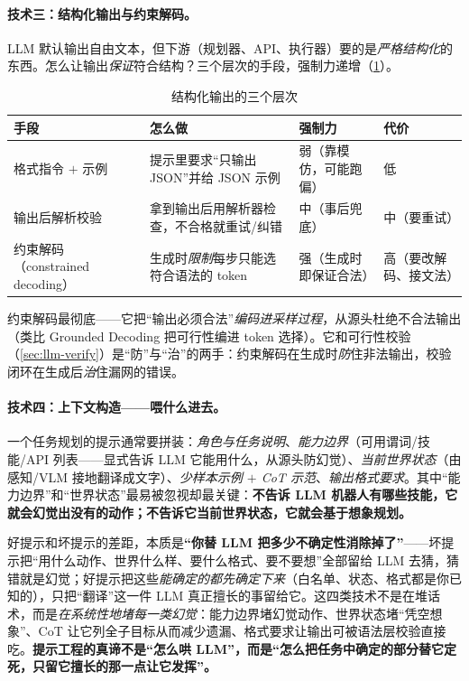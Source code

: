 \paragraph{技术三：结构化输出与约束解码。}
LLM 默认输出自由文本，但下游（规划器、API、执行器）要的是\emph{严格结构化}的东西。怎么让输出\emph{保证}符合结构？三个层次的手段，强制力递增（\cref{tab:structured-output}）。

\begin{table}[H]\centering\small
\caption{结构化输出的三个层次}
\label{tab:structured-output}
\begin{tabular}{p{3.0cm}p{5.0cm}p{2.4cm}p{1.8cm}}
\toprule
手段 & 怎么做 & 强制力 & 代价 \\
\midrule
格式指令 $+$ 示例 & 提示里要求“只输出 JSON”并给 JSON 示例 & 弱（靠模仿，可能跑偏） & 低 \\
输出后解析校验 & 拿到输出后用解析器检查，不合格就重试/纠错 & 中（事后兜底） & 中（要重试） \\
约束解码（constrained decoding） & 生成时\emph{限制}每步只能选符合语法的 token & 强（生成时即保证合法） & 高（要改解码、接文法） \\
\bottomrule
\end{tabular}
\end{table}

\noindent 约束解码最彻底——它把“输出必须合法”\emph{编码进采样过程}，从源头杜绝不合法输出（类比 Grounded Decoding 把可行性编进 token 选择）。它和可行性校验（\cref{sec:llm-verify}）是“防”与“治”的两手：约束解码在生成时\emph{防}住非法输出，校验闭环在生成后\emph{治}住漏网的错误。

\paragraph{技术四：上下文构造——喂什么进去。}
一个任务规划的提示通常要拼装：\emph{角色与任务说明}、\emph{能力边界}（可用谓词/技能/API 列表——显式告诉 LLM 它能用什么，从源头防幻觉）、\emph{当前世界状态}（由感知/VLM 接地翻译成文字）、\emph{少样本示例 $+$ CoT 示范}、\emph{输出格式要求}。其中“能力边界”和“世界状态”最易被忽视却最关键：\textbf{不告诉 LLM 机器人有哪些技能，它就会幻觉出没有的动作；不告诉它当前世界状态，它就会基于想象规划。}

\begin{insight}
好提示和坏提示的差距，本质是\textbf{“你替 LLM 把多少不确定性消除掉了”}——坏提示把“用什么动作、世界什么样、要什么格式、要不要想”全部留给 LLM 去猜，猜错就是幻觉；好提示把这些\emph{能确定的都先确定下来}（白名单、状态、格式都是你已知的），只把“翻译”这一件 LLM 真正擅长的事留给它。这四类技术不是在堆话术，而是\emph{在系统性地堵每一类幻觉}：能力边界堵幻觉动作、世界状态堵“凭空想象”、CoT 让它列全子目标从而减少遗漏、格式要求让输出可被语法层校验直接吃。\textbf{提示工程的真谛不是“怎么哄 LLM”，而是“怎么把任务中确定的部分替它定死，只留它擅长的那一点让它发挥”。}
\end{insight}

